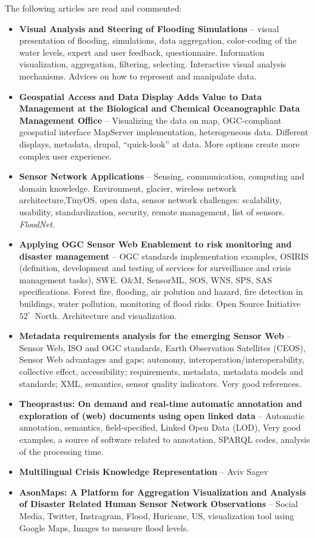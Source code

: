 \documentclass[11pt,twoside,a4paper]{article}
\begin{document}
The following articles are read and commented:
\begin{itemize}
  \item {\bf Visual Analysis and Steering of Flooding Simulations} \citep{ribicic:2012} -- visual presentation of flooding, simulations, data aggregation, color-coding of the water levels, expert and user feedback, questionnaire. Information visualization, aggregation, filtering, selecting. Interactive visual analysis mechanisms. Advices on how to represent and manipulate data.
    \item  {\bf Geospatial Access and Data Display Adds Value to Data Management at the Biological and Chemical Oceanographic Data Management Office} \citep{dickson:2014} -- Visualizing the data on map, OGC-compliant geospatial interface MapServer implementation, heterogeneous data. Different displays, metadata, drupal, ``quick-look'' at data. More options create more complex user experience.
    \item {\bf Sensor Network Applications} \citep{martinez:2004} -- Sensing, communication, computing and domain knowledge. Environment, glacier, wireless network architecture,TinyOS, open data, sensor network challenges: scalability, usability, standardization, security, remote management, list of sensors. \emph{FloodNet}.
    \item {\bf Applying OGC Sensor Web Enablement to risk monitoring and disaster management} \citep{jirka:2009} -- OGC standards implementation examples, OSIRIS (definition, development and testing of services for surveillance and crisis management tasks), SWE. O\&M, SensorML, SOS, WNS, SPS, SAS specifications. Forest fire, flooding, air polution and hazard, fire detection in buildings, water pollution, monitoring of flood risks. Open Source Initiative $52^{\circ}$~North. Architecture and visualization. 
    \item {\bf Metadata requirements analysis for the emerging Sensor Web} \citep{di:2008} -- Sensor Web, ISO and OGC standards, Earth Observation Satellites (CEOS), Sensor Web advantages and gaps; autonomy, interoperation/interoperability, collective effect, accessibility; requirements, metadata, metadata models and standards; XML, semantics, sensor quality indicators. Very good references.
    \item {\bf Theoprastus: On demand and real-time automatic annotation and exploration of (web) documents using open linked data} \citep{fafalios:2014} 
-- Automatic annotation, semantics, field-specified, Linked Open Data (LOD), Very good examples, a source of software related to annotation, SPARQL codes, analysis of the processing time.
    \item {\bf Multilingual Crisis Knowledge Representation} -- Aviv Sagev \citep{sagev:2011} 
    \item {\bf AsonMaps: A Platform for Aggregation Visualization and Analysis of Disaster Related Human Sensor Network Observations} \citep{aulov:2014} 
-- Social Media, Twitter, Instragram, Flood, Huricane, US, visualization tool using Google Maps, Images to measure flood levels.
\end{itemize}

{}
%

\end{document}
